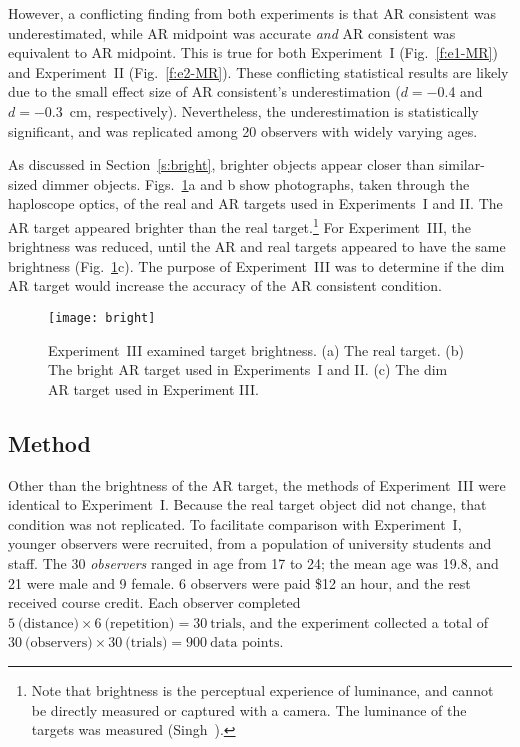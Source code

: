 \documentclass[10pt,journal,compsoc]{IEEEtran}
\newlength{\FigWidth}
\begin{document}
However, a conflicting finding from both experiments is that AR consistent was underestimated, while AR midpoint was accurate \emph{and} AR consistent was equivalent to AR midpoint.  This is true for both Experiment~I (Fig.~\ref{f:e1-MR}) and Experiment~II (Fig.~\ref{f:e2-MR}).  These conflicting statistical results are likely due to the small effect size of AR consistent's underestimation ($d = -$0.4 and $d = -$0.3~cm, respectively).  Nevertheless, the underestimation is statistically significant, and was replicated among 20 observers with widely varying ages. 

As discussed in Section~\ref{s:bright}, brighter objects appear closer than similar-sized dimmer objects.  Figs.~\ref{f:bright}a and b show photographs, taken through the haploscope optics, of the real and AR targets used in Experiments~I and II.  The AR target appeared brighter than the real target.\footnote{%
Note that brightness is the perceptual experience of luminance, and cannot be directly measured or captured with a camera.  The luminance of the targets was measured (Singh~\cite{singh:2013}).} %
For Experiment~III, the brightness was reduced, until the AR and real targets appeared to have the same brightness (Fig.~\ref{f:bright}c).  The purpose of Experiment~III was to determine if the dim AR target would increase the accuracy of the AR consistent condition.  

\begin{figure}[!t]
\centering
\texttt{[image: bright]}
\caption{Experiment~III examined target brightness.  (a) The real target.  (b) The bright AR target used in Experiments~I and II.  (c) The dim AR target used in Experiment III.}
\label{f:bright}
\end{figure}

\subsection {Method}

Other than the brightness of the AR target, the methods of Experiment~III were identical to Experiment~I.  Because the real target object did not change, that condition was not replicated.  To facilitate comparison with Experiment~I, younger observers were recruited, from a population of university students and staff.  The 30 \emph{observers} ranged in age from 17 to 24; the mean age was 19.8, and 21 were male and 9 female.  6 observers were paid \$12 an hour, and the rest received course credit.  Each observer completed $5\ \mbox{(distance)} \times 6\  \mbox{(repetition)} = 30\ \mbox{trials}$, and the experiment collected a total of $30\  \mbox{(observers)} \times 30\ \mbox{(trials)} = 900\ \mbox{data points}$.
\end{document}
